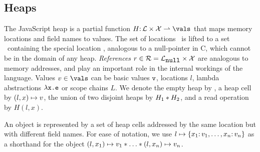 \documentclass{article}
\begin{document}





\subsection{Heaps}\label{sec:syntax2}


%
The JavaScript heap is a partial function $H \ty \loc \times \vars \rightharpoonup \vals$ that maps memory locations  and field names to values.  
%
The set of locations \loc\ is lifted to a set \locb\ containing the special location \nil, analogous to a null-pointer in C, which cannot be in the domain of any %
heap.
%
{\em References} $r \in \mathcal{R}= \mathcal{L}_{\mbox{\texttt{{\upshape null}}}} \times \mathcal{X}$ are analogous to memory addresses, and play an important role in the internal workings of the language.
%
Values $v\in\vals$ can be basic values $\mbox{\texttt{{\upshape v}}}$, locations $l$, lambda abstractions $\lambda\mbox{\texttt{{\upshape x.e}}}$ or scope chains $L$. 
%
We denote the empty heap by \emp, a heap cell by $(l,x)\mapsto v$, the union of two disjoint heaps %
by $H_1\mathbin{*} H_2$, and a read operation by $H(l,x)$. 



%
An object is represented by a set of heap cells addressed by the same location but with different field names.
%
%
For ease of notation,  we use $l\mapsto\{x_1{:\,} v_1,\ldots, x_n{:\,} v_n\}$ as a shorthand for the object $(l,x_1)\mapsto v_1\mathbin{*}\ldots \mathbin{*} (l,x_n)\mapsto v_n$.
\end{document}
